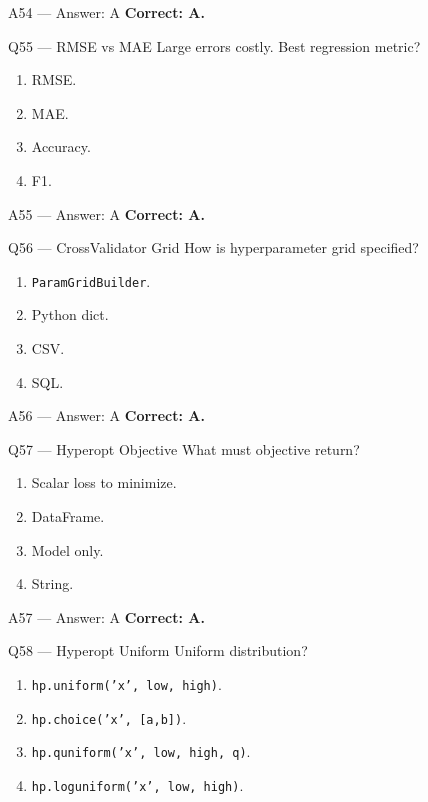 \documentclass[aspectratio=169,9pt]{beamer}
\begin{document}
	\begin{frame}{A54 — Answer: A}
		\textbf{Correct: A.}
	\end{frame}
	
	\begin{frame}{Q55 — RMSE vs MAE}
		Large errors costly. Best regression metric?
		\begin{enumerate}[label=\Alph*.]
			\item RMSE.
			\item MAE.
			\item Accuracy.
			\item F1.
		\end{enumerate}
	\end{frame}
	
	\begin{frame}{A55 — Answer: A}
		\textbf{Correct: A.}
	\end{frame}
	
	\begin{frame}{Q56 — CrossValidator Grid}
		How is hyperparameter grid specified?
		\begin{enumerate}[label=\Alph*.]
			\item \texttt{ParamGridBuilder}.
			\item Python dict.
			\item CSV.
			\item SQL.
		\end{enumerate}
	\end{frame}
	
	\begin{frame}{A56 — Answer: A}
		\textbf{Correct: A.}
	\end{frame}
	
	\begin{frame}{Q57 — Hyperopt Objective}
		What must objective return?
		\begin{enumerate}[label=\Alph*.]
			\item Scalar loss to minimize.
			\item DataFrame.
			\item Model only.
			\item String.
		\end{enumerate}
	\end{frame}
	
	\begin{frame}{A57 — Answer: A}
		\textbf{Correct: A.}
	\end{frame}
	
	\begin{frame}{Q58 — Hyperopt Uniform}
		Uniform distribution?
		\begin{enumerate}[label=\Alph*.]
			\item \texttt{hp.uniform('x', low, high)}.
			\item \texttt{hp.choice('x', [a,b])}.
			\item \texttt{hp.quniform('x', low, high, q)}.
			\item \texttt{hp.loguniform('x', low, high)}.
		\end{enumerate}
	\end{frame}
	
\end{document}
